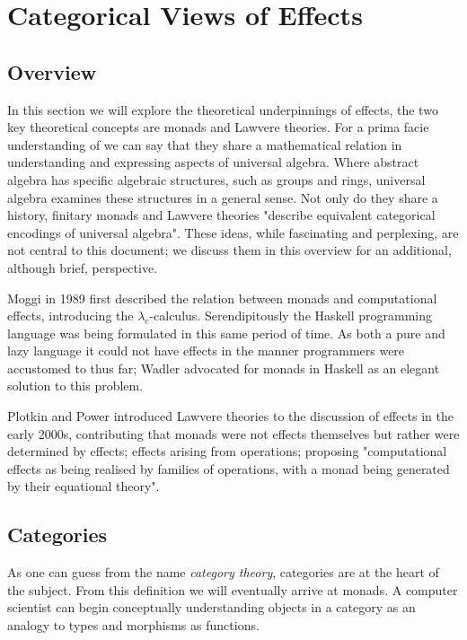 \section{Categorical Views of Effects}

\subsection{Overview}
In this section we will explore the theoretical underpinnings of effects,
the two key theoretical concepts are monads and Lawvere theories.
For a prima facie understanding of we can say that
they share a mathematical relation in understanding and expressing aspects of universal algebra.
Where abstract algebra has specific algebraic structures, such as groups and rings,
universal algebra examines these structures in a general sense.
Not only do they share a history, finitary monads and Lawvere theories
"describe equivalent categorical encodings of universal algebra"\cite{riehl}.
These ideas, while fascinating and perplexing,
are not central to this document;
we discuss them in this overview for an additional,
although brief, perspective.

Moggi in 1989 \cite{moggi1989computational}
first described the relation between monads and computational effects,
introducing the $\lambda_c$-calculus.
Serendipitously the Haskell programming language\cite{hudak1992report}
was being formulated in this same period of time.
As both a pure and lazy language
it could not have effects in the manner programmers were accustomed to thus far;
Wadler\cite{wadler1990} advocated for monads in Haskell as an elegant
solution to this problem.

Plotkin and Power \cite{Plotkin:2001jr}
introduced Lawvere theories to the discussion of effects
in the early 2000s,
contributing that monads were not effects themselves but rather were determined by effects;
effects arising from operations; proposing "computational effects as being realised by
families of operations, with a monad being generated by their equational theory"\cite{Plotkin:2002dw}.

\subsection{Categories}
As one can guess from the name \textit{category theory},
categories are at the heart of the subject.
From this definition we will eventually arrive at monads.
A computer scientist can begin conceptually
understanding objects in a category
as an analogy to types
and morphisms as functions.\\

